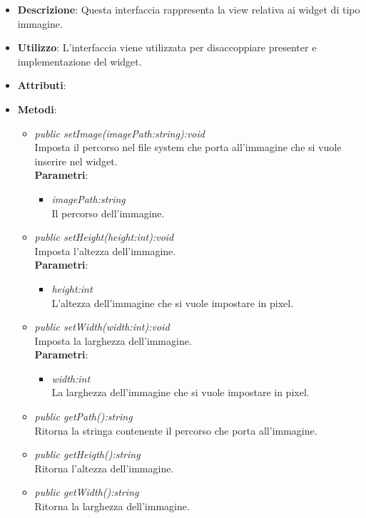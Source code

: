 \begin{itemize}
\item \textbf{Descrizione}: Questa interfaccia rappresenta la view relativa ai widget di tipo immagine.
\item \textbf{Utilizzo}: L'interfaccia viene utilizzata per disaccoppiare presenter e implementazione del widget.
\item \textbf{Attributi}:
\item \textbf{Metodi}:
	\begin{itemize}
	\item \textit{public setImage(imagePath:string):void}\\
	Imposta il percorso nel file system che porta all'immagine che si vuole inserire nel widget.
		\\ \textbf{Parametri}: \begin{itemize}
		\item \textit{imagePath:string}\\
		Il percorso dell'immagine.
		\end{itemize} 
	\item \textit{public setHeight(height:int):void}\\
	Imposta l'altezza dell'immagine.
		\\ \textbf{Parametri}: \begin{itemize}
		\item \textit{height:int}\\
		L'altezza dell'immagine che si vuole impostare in pixel.
		\end{itemize} 
	\item \textit{public setWidth(width:int):void}\\
	Imposta la larghezza dell'immagine.
		\\ \textbf{Parametri}: \begin{itemize}
		\item \textit{width:int}\\
		La larghezza dell'immagine che si vuole impostare in pixel.
		\end{itemize} 
	\item \textit{public getPath():string}\\
	Ritorna la stringa contenente il percorso che porta all'immagine.
	\item \textit{public getHeigth():string}\\
	Ritorna l'altezza dell'immagine.
	\item \textit{public getWidth():string}\\
	Ritorna la larghezza dell'immagine.
	\end{itemize}
\end{itemize}

